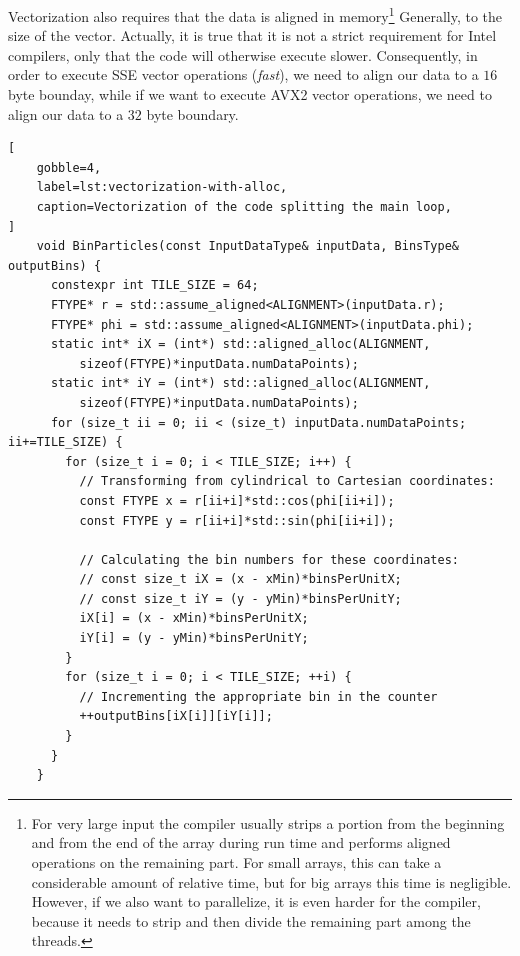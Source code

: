 \documentclass[
    12pt, %
]{fphw}
\begin{document}
    Vectorization also requires that the data is aligned in memory\footnote{
    For very large input the compiler usually strips
    a portion from the beginning and from the end of the array
    during run time and performs aligned operations on the remaining part.
    For small arrays, this can take a considerable amount of relative time,
    but for big arrays this time is negligible.
    However, if we also want to parallelize, it is even harder for the compiler,
    because it needs to strip and then divide the remaining part among the threads.
}
Generally, to the size of the vector.
Actually, it is true that it is not a strict requirement for Intel compilers,
only that the code will otherwise execute slower.
Consequently, in order to execute SSE vector operations (\textit{fast}),
we need to align our data to a $16$ byte bounday,
while if we want to execute AVX2 vector operations,
we need to align our data to a $32$ byte boundary.

\begin{lstlisting}[
    gobble=4,
    label=lst:vectorization-with-alloc,
    caption=Vectorization of the code splitting the main loop,
]
    void BinParticles(const InputDataType& inputData, BinsType& outputBins) {
      constexpr int TILE_SIZE = 64;
      FTYPE* r = std::assume_aligned<ALIGNMENT>(inputData.r);
      FTYPE* phi = std::assume_aligned<ALIGNMENT>(inputData.phi);
      static int* iX = (int*) std::aligned_alloc(ALIGNMENT,
          sizeof(FTYPE)*inputData.numDataPoints);
      static int* iY = (int*) std::aligned_alloc(ALIGNMENT,
          sizeof(FTYPE)*inputData.numDataPoints);
      for (size_t ii = 0; ii < (size_t) inputData.numDataPoints; ii+=TILE_SIZE) {
        for (size_t i = 0; i < TILE_SIZE; i++) { 
          // Transforming from cylindrical to Cartesian coordinates:
          const FTYPE x = r[ii+i]*std::cos(phi[ii+i]);
          const FTYPE y = r[ii+i]*std::sin(phi[ii+i]);

          // Calculating the bin numbers for these coordinates:
          // const size_t iX = (x - xMin)*binsPerUnitX;
          // const size_t iY = (y - yMin)*binsPerUnitY;
          iX[i] = (x - xMin)*binsPerUnitX;
          iY[i] = (y - yMin)*binsPerUnitY;
        }
        for (size_t i = 0; i < TILE_SIZE; ++i) {
          // Incrementing the appropriate bin in the counter
          ++outputBins[iX[i]][iY[i]];
        }
      }
    }

\end{lstlisting}
\end{document}
